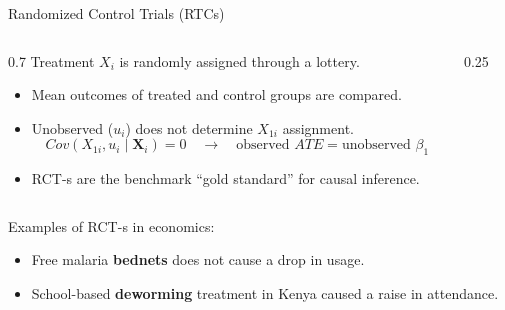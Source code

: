 \documentclass[9pt,aspectratio=169]{beamer}
\begin{document}
\begin{frame}{Randomized Control Trials (RTCs)}
  \begin{columns}[c]
  \begin{column}{0.7\textwidth}
  Treatment $X_i$ is randomly assigned through a lottery.
  \begin{itemize}
    \item Mean outcomes of treated and control groups are compared.
    \item[$\rightarrow$] Unobserved ($u_i$) does not determine $X_{1i}$ assignment.
    \[
    Cov(X_{1i},u_i\mid\boldsymbol{X}_i) = 0 \quad\rightarrow\quad \text{observed } ATE = \text{unobserved } \beta_1
    \]
    \item RCT-s are the benchmark ``gold standard'' for causal inference.
  \end{itemize}
  \end{column}
  \begin{column}{0.25\textwidth}
  \centering
  \\[0.3em]
  \end{column}
  \end{columns}
  \pause
  \vspace{0.5cm}
  Examples of RCT-s in economics:
  \begin{itemize}\setlength{\itemsep}{0pt}
    \item Free malaria \textbf{bednets} does not cause a drop in usage.
    \item School-based \textbf{deworming} treatment in Kenya caused a raise in attendance.
  \end{itemize}
\end{frame}
\end{document}
